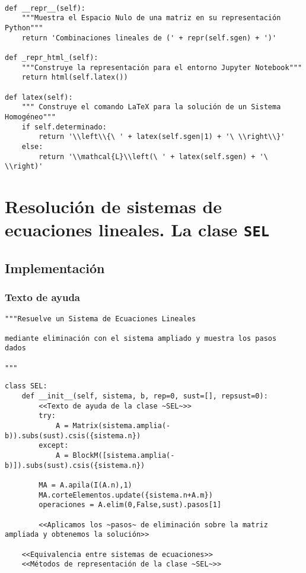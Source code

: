 \documentclass[11pt]{report}
\begin{document}
\begin{verbatim}

def __repr__(self):
    """Muestra el Espacio Nulo de una matriz en su representación Python"""
    return 'Combinaciones lineales de (' + repr(self.sgen) + ')'

def _repr_html_(self):
    """Construye la representación para el entorno Jupyter Notebook"""
    return html(self.latex())

def latex(self):
    """ Construye el comando LaTeX para la solución de un Sistema Homogéneo"""
    if self.determinado:
        return '\\left\\{\ ' + latex(self.sgen|1) + '\ \\right\\}'
    else:
        return '\\mathcal{L}\\left(\ ' + latex(self.sgen) + '\ \\right)' 

\end{verbatim}


\chapter{Resolución de sistemas de ecuaciones lineales. La clase  \texttt{SEL}}
\label{sec:org018eef3}

\section{Implementación}
\label{sec:org2f67565}
\subsection{Texto de ayuda}
\label{sec:org365674a}

\begin{verbatim}
"""Resuelve un Sistema de Ecuaciones Lineales

mediante eliminación con el sistema ampliado y muestra los pasos
dados

"""
\end{verbatim}

\begin{verbatim}
class SEL:
    def __init__(self, sistema, b, rep=0, sust=[], repsust=0):
        <<Texto de ayuda de la clase ~SEL~>>
        try:
            A = Matrix(sistema.amplia(-b)).subs(sust).csis({sistema.n})
        except:
            A = BlockM([sistema.amplia(-b)]).subs(sust).csis({sistema.n})
            
        MA = A.apila(I(A.n),1)
        MA.corteElementos.update({sistema.n+A.m})
        operaciones = A.elim(0,False,sust).pasos[1]
        
        <<Aplicamos los ~pasos~ de eliminación sobre la matriz ampliada y obtenemos la solución>>

    <<Equivalencia entre sistemas de ecuaciones>>
    <<Métodos de representación de la clase ~SEL~>>
    
\end{verbatim}
\end{document}
